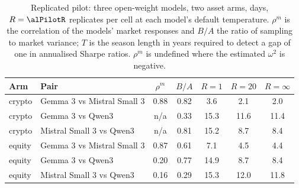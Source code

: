 \begin{table}[ht]
\centering
\small
\caption{Replicated pilot: three open-weight models, two asset arms, \alPilotDays{} days, $R=\alPilotR$ replicates per cell at each model's default temperature. $\rho^m$ is the correlation of the models' market responses and $B/A$ the ratio of sampling to market variance; $T$ is the season length in years required to detect a gap of one in annualised Sharpe ratios. $\rho^m$ is undefined where the estimated $\omega^2$ is negative.}
\label{tab:pilot}
\begin{tabular}{llccccc}
\toprule
Arm & Pair & $\rho^m$ & $B/A$ & $R=1$ & $R=20$ & $R=\infty$ \\
\midrule
crypto & Gemma 3 vs Mistral Small 3 & 0.88 & 0.82 & 3.6 & 2.1 & 2.0 \\
crypto & Gemma 3 vs Qwen3 & n/a & 0.33 & 15.3 & 11.6 & 11.4 \\
crypto & Mistral Small 3 vs Qwen3 & n/a & 0.81 & 15.2 & 8.7 & 8.4 \\
equity & Gemma 3 vs Mistral Small 3 & 0.87 & 0.61 & 7.1 & 4.5 & 4.4 \\
equity & Gemma 3 vs Qwen3 & 0.20 & 0.77 & 14.9 & 8.7 & 8.4 \\
equity & Mistral Small 3 vs Qwen3 & 0.16 & 0.29 & 15.3 & 12.0 & 11.8 \\
\bottomrule
\end{tabular}
\end{table}
